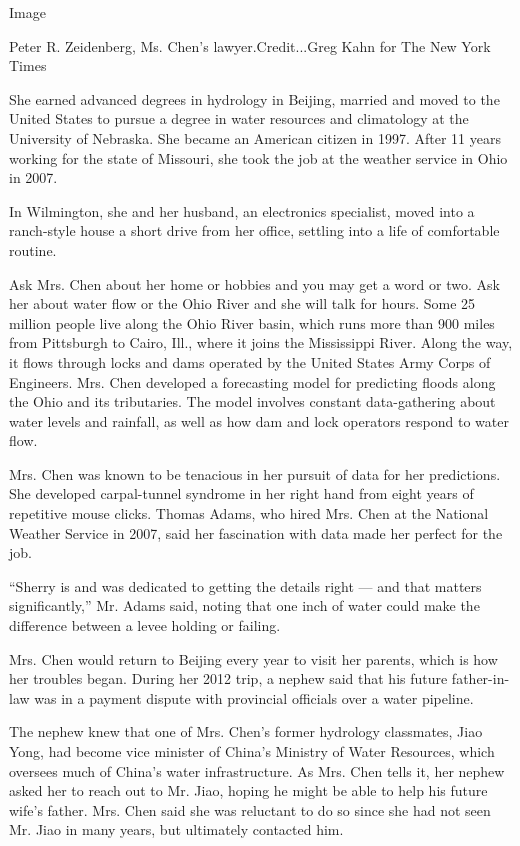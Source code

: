 Image

Peter R. Zeidenberg, Ms. Chen's lawyer.Credit...Greg Kahn for The New
York Times

She earned advanced degrees in hydrology in Beijing, married and moved
to the United States to pursue a degree in water resources and
climatology at the University of Nebraska. She became an American
citizen in 1997. After 11 years working for the state of Missouri, she
took the job at the weather service in Ohio in 2007.

In Wilmington, she and her husband, an electronics specialist, moved
into a ranch-style house a short drive from her office, settling into a
life of comfortable routine.

Ask Mrs. Chen about her home or hobbies and you may get a word or two.
Ask her about water flow or the Ohio River and she will talk for hours.
Some 25 million people live along the Ohio River basin, which runs more
than 900 miles from Pittsburgh to Cairo, Ill., where it joins the
Mississippi River. Along the way, it flows through locks and dams
operated by the United States Army Corps of Engineers. Mrs. Chen
developed a forecasting model for predicting floods along the Ohio and
its tributaries. The model involves constant data-gathering about water
levels and rainfall, as well as how dam and lock operators respond to
water flow.

Mrs. Chen was known to be tenacious in her pursuit of data for her
predictions. She developed carpal-tunnel syndrome in her right hand from
eight years of repetitive mouse clicks. Thomas Adams, who hired Mrs.
Chen at the National Weather Service in 2007, said her fascination with
data made her perfect for the job.

``Sherry is and was dedicated to getting the details right --- and that
matters significantly,'' Mr. Adams said, noting that one inch of water
could make the difference between a levee holding or failing.

Mrs. Chen would return to Beijing every year to visit her parents, which
is how her troubles began. During her 2012 trip, a nephew said that his
future father-in-law was in a payment dispute with provincial officials
over a water pipeline.

The nephew knew that one of Mrs. Chen's former hydrology classmates,
Jiao Yong, had become vice minister of China's Ministry of Water
Resources, which oversees much of China's water infrastructure. As Mrs.
Chen tells it, her nephew asked her to reach out to Mr. Jiao, hoping he
might be able to help his future wife's father. Mrs. Chen said she was
reluctant to do so since she had not seen Mr. Jiao in many years, but
ultimately contacted him.

